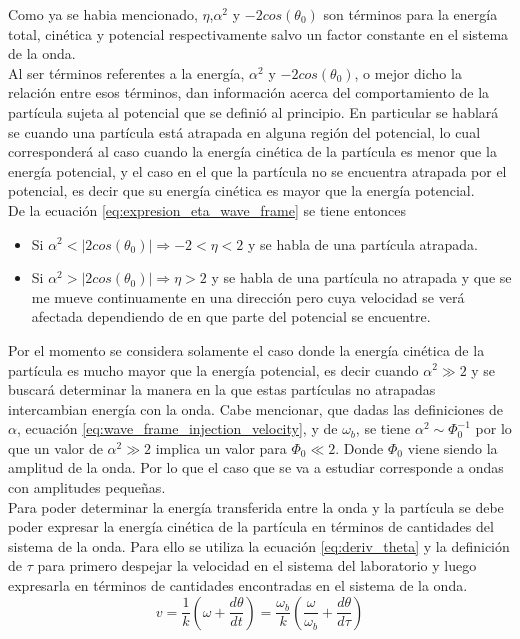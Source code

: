 Como ya se habia mencionado, $\eta$,$\alpha^2$ y $-2cos(\theta_0)$ son términos para la energía total, cinética y potencial respectivamente salvo un factor constante en el sistema de la onda.\\
Al ser términos referentes a la energía, $\alpha^2$ y $-2cos(\theta_0)$, o mejor dicho la relación entre esos términos, dan información acerca del comportamiento de la partícula sujeta al potencial que se definió al principio. En particular se hablará se cuando una partícula está atrapada en alguna región del potencial, lo cual corresponderá al caso cuando la energía cinética de la partícula es menor que la energía potencial, y el caso en el que la partícula no se encuentra atrapada por el potencial, es decir que su energía cinética es mayor que la energía potencial.\\
De la ecuación \ref{eq:expresion_eta_wave_frame} se tiene entonces
\begin{itemize}
\item Si $\alpha^2 < |2cos(\theta_0)| \Rightarrow -2<\eta<2$ y se habla de una partícula atrapada.
\item Si $\alpha^2 > |2cos(\theta_0)| \Rightarrow \eta>2$ y se habla de una partícula no atrapada y que se me mueve continuamente en una dirección pero cuya velocidad se verá afectada dependiendo de en que parte del potencial se encuentre.
\end{itemize}
Por el momento se considera solamente el caso donde la energía cinética de la partícula es mucho mayor que la energía potencial, es decir cuando $\alpha^2 \gg 2$ y se buscará determinar la manera en la que estas partículas no atrapadas intercambian energía con la onda. Cabe mencionar, que dadas las definiciones de $\alpha$, ecuación \ref{eq:wave_frame_injection_velocity}, y de $\omega_b$, se tiene $\alpha^2 \sim \Phi_0^{-1}$ por lo que un valor de $\alpha^2 \gg 2$ implica un valor para $\Phi_0 \ll 2$. Donde $\Phi_0$ viene siendo la amplitud de la onda. Por lo que el caso que se va a estudiar corresponde a ondas con amplitudes pequeñas.\\
Para poder determinar la energía transferida entre la onda y la partícula se debe poder expresar la energía cinética de la partícula en términos de cantidades del sistema de la onda. Para ello se utiliza la ecuación \ref{eq:deriv_theta} y la definición de $\tau$ para primero despejar la velocidad en el sistema del laboratorio y luego expresarla en términos de cantidades encontradas en el sistema de la onda.
\begin{equation}
\label{eq:velocidad_lab_transferencia}
v =\frac{1}{k}\left(\omega +\frac{d\theta}{dt}\right)= \frac{\omega_b}{k}\left(\frac{\omega}{\omega_b} +\frac{d\theta}{d\tau}\right)
\end{equation}
